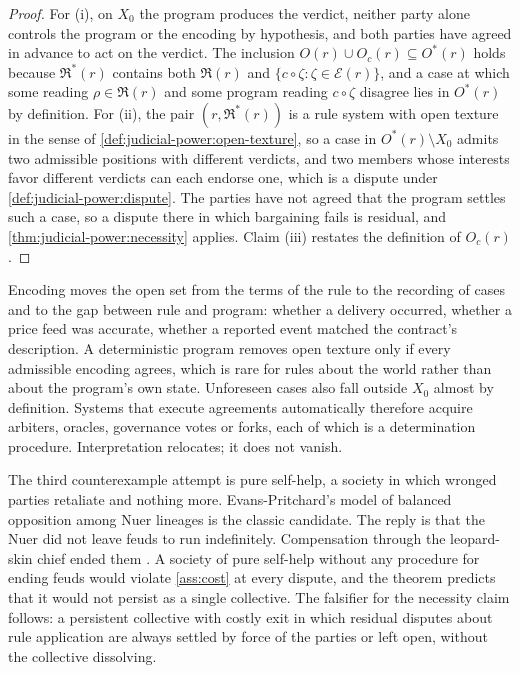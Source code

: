 \documentclass[11pt,letterpaper]{article}
\theoremstyle{definition}
\theoremstyle{remark}
\newcommand{\Read}{\mathfrak{R}}
\begin{document}
\begin{proof}
For (i), on $X_0$ the program produces the verdict, neither party alone controls the program or the encoding by hypothesis, and both parties have agreed in advance to act on the verdict. The inclusion $O(r)\cup O_c(r)\subseteq O^{*}(r)$ holds because $\Read^{*}(r)$ contains both $\Read(r)$ and $\{c\circ\zeta:\zeta\in\mathcal{E}(r)\}$, and a case at which some reading $\rho\in\Read(r)$ and some program reading $c\circ\zeta$ disagree lies in $O^{*}(r)$ by definition. For (ii), the pair $(r,\Read^{*}(r))$ is a rule system with open texture in the sense of \cref{def:judicial-power:open-texture}, so a case in $O^{*}(r)\setminus X_0$ admits two admissible positions with different verdicts, and two members whose interests favor different verdicts can each endorse one, which is a dispute under \cref{def:judicial-power:dispute}. The parties have not agreed that the program settles such a case, so a dispute there in which bargaining fails is residual, and \cref{thm:judicial-power:necessity} applies. Claim (iii) restates the definition of $O_c(r)$.
\end{proof}

Encoding moves the open set from the terms of the rule to the recording of cases and to the gap between rule and program: whether a delivery occurred, whether a price feed was accurate, whether a reported event matched the contract's description. A deterministic program removes open texture only if every admissible encoding agrees, which is rare for rules about the world rather than about the program's own state. Unforeseen cases also fall outside $X_0$ almost by definition. Systems that execute agreements automatically therefore acquire arbiters, oracles, governance votes or forks, each of which is a determination procedure. Interpretation relocates; it does not vanish.

The third counterexample attempt is pure self-help, a society in which wronged parties retaliate and nothing more. Evans-Pritchard's model of balanced opposition among Nuer lineages is the classic candidate. The reply is that the Nuer did not leave feuds to run indefinitely. Compensation through the leopard-skin chief ended them \citep{evanspritchard1940}. A society of pure self-help without any procedure for ending feuds would violate \cref{ass:cost} at every dispute, and the theorem predicts that it would not persist as a single collective. The falsifier for the necessity claim follows: a persistent collective with costly exit in which residual disputes about rule application are always settled by force of the parties or left open, without the collective dissolving.
\end{document}
